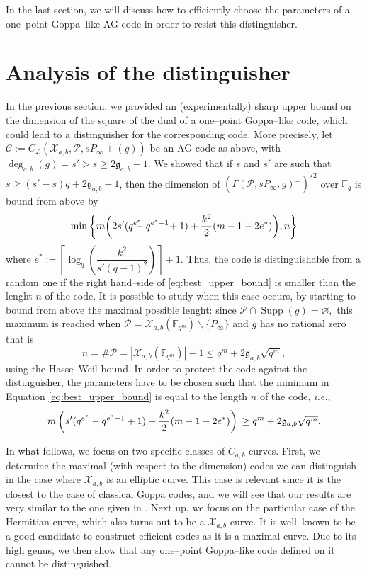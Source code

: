 \documentclass[peerreview]{IEEEtran}
\theoremstyle{plain}
\theoremstyle{definition}
\theoremstyle{remark}
\newcommand{\calP}{\mathcal{P}}
\newcommand{\calL}{\mathcal{L}}
\newcommand{\calC}{\mathcal{C}}
\newcommand{\calX}{\mathcal{X}}
\newcommand{\fqm}{\mathbb{F}_{q^m}}
\newcommand{\fq}{\mathbb{F}_{q}}
\newcommand{\Supp}{\operatorname{Supp}}
\newcommand{\degab}[1]{\deg_{a,b}\left(#1\right)}
\begin{document}
	In the last section, we will discuss how to efficiently choose the parameters of a one--point Goppa--like AG code in order to resist this distinguisher.
	
	\section{Analysis of the distinguisher}\label{sec:analysis}
	
	In the previous section, we provided an (experimentally) sharp upper bound on the dimension of the square of the dual of a one--point Goppa--like code, which could lead to a distinguisher for the corresponding code. More precisely, let $\calC := C_\calL(\calX_{a,b},\calP,sP_\infty +(g))$ be an AG code as above, with $\degab{g} = s'>s\geq 2\mathfrak{g}_{a,b}-1$. We showed that if $s$ and $s'$ are such that $s \geq (s'-s)q+2\mathfrak{g}_{a,b}-1$, then the dimension of $(\Gamma(\calP,sP_\infty,g)^{\perp})^{\star 2}$ over $\fq$ is bound from above by
	\begin{equation} \label{eq:best_upper_bound}
		\min \left\{m\!\left(2s'(q^{\mathrlap{e^*}}-q^{e^*-1}\!+1)+\frac{k^2}{2}(m-1-2e^*)  \right)\!,n\right\}
	\end{equation}
	where $e^* := \left\lceil \log_q\left(\dfrac{k^2}{s'(q-1)^2}\right)\right\rceil+1$. Thus, the code is distinguishable from a random one if the right hand--side of \eqref{eq:best_upper_bound} is smaller than the lenght $n$ of the code. It is possible to study when this case occurs, by starting to bound from above the maximal possible lenght: since $\calP \cap \Supp(g) = \varnothing,$ this maximum is reached when $\calP = \calX_{a,b}(\fqm) \backslash \{P_\infty\}$ and $g$ has no rational zero that is
	$$n = \# \calP = |\calX_{a,b}(\fqm)|-1 \leq q^m+2\mathfrak{g}_{a,b}\sqrt{q^m},$$
	using the Hasse--Weil bound. In order to protect the code against the distinguisher, the parameters have to be chosen such that the minimum in Equation \eqref{eq:best_upper_bound} is equal to the length $n$ of the code, \textit{i.e.}, 
	\begin{equation}
		\label{eq:cond_not_to_distinguish}
		m\left(s'(q^{e^*}-q^{e^*-1}+1)+\frac{k^2}{2}(m-1-2e^*)  \right)\\
		\geq q^m+2\mathfrak{g}_{a,b}\sqrt{q^m}.
	\end{equation}
	
	In what follows, we focus on two specific classes of $C_{a,b}$ curves. First, we determine the maximal (with respect to the dimension) codes we can distinguish in the case where $\calX_{a,b}$ is an elliptic curve. This case is relevant since it is the closest to the case of classical Goppa codes, and we will see that our results are very similar to the one given in \cite{MT21}. Next up, we focus on the particular case of the Hermitian curve, which also turns out to be a $\calX_{a,b}$ curve. It is well--known to be a good candidate to construct efficient codes as it is a maximal curve. Due to its high genus, we then show that any one--point Goppa--like code defined on it cannot be distinguished.
	
\end{document}
